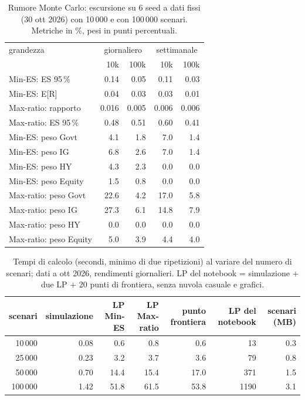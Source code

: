 \begin{table}[htbp]\centering\small\setlength{\tabcolsep}{3.5pt}
\caption{Rumore Monte Carlo: escursione su 6 seed a dati fissi (30 ott 2026) con 10\,000 e con 100\,000 scenari. Metriche in \%, pesi in punti percentuali.}\label{tab:noise_cmp}
\begin{tabular}{lrrrr}\toprule
grandezza & \multicolumn{2}{c}{giornaliero} & \multicolumn{2}{c}{settimanale} \\
 & 10k & 100k & 10k & 100k \\ \midrule
Min-ES: ES 95\,\% & 0.14 & 0.05 & 0.11 & 0.03 \\
Min-ES: E[R] & 0.04 & 0.03 & 0.03 & 0.01 \\
Max-ratio: rapporto & 0.016 & 0.005 & 0.006 & 0.006 \\
Max-ratio: ES 95\,\% & 0.48 & 0.51 & 0.60 & 0.41 \\
Min-ES: peso Govt & 4.1 & 1.8 & 7.0 & 1.4 \\
Min-ES: peso IG & 6.8 & 2.6 & 7.0 & 1.4 \\
Min-ES: peso HY & 4.3 & 2.3 & 0.0 & 0.0 \\
Min-ES: peso Equity & 1.5 & 0.8 & 0.0 & 0.0 \\
Max-ratio: peso Govt & 22.6 & 4.2 & 17.0 & 5.8 \\
Max-ratio: peso IG & 27.3 & 6.1 & 14.8 & 7.9 \\
Max-ratio: peso HY & 0.0 & 0.0 & 0.0 & 0.0 \\
Max-ratio: peso Equity & 5.0 & 3.9 & 4.4 & 4.0 \\
\bottomrule\end{tabular}\end{table}

\begin{table}[htbp]\centering\footnotesize\setlength{\tabcolsep}{4pt}
\caption{Tempi di calcolo (secondi, minimo di due ripetizioni) al variare del numero di scenari; dati a ott 2026, rendimenti giornalieri. LP del notebook = simulazione + due LP + 20 punti di frontiera, senza nuvola casuale e grafici.}\label{tab:bench}
\begin{tabular}{rrrrrrr}\toprule
scenari & simulazione & LP Min-ES & LP Max-ratio & punto frontiera & LP del notebook & scenari (MB) \\ \midrule
10\,000 & 0.08 & 0.6 & 0.8 & 0.6 & 13 & 0.3 \\
25\,000 & 0.23 & 3.2 & 3.7 & 3.6 & 79 & 0.8 \\
50\,000 & 0.70 & 14.4 & 15.4 & 17.0 & 371 & 1.5 \\
100\,000 & 1.42 & 51.8 & 61.5 & 53.8 & 1190 & 3.1 \\
\bottomrule\end{tabular}\end{table}
